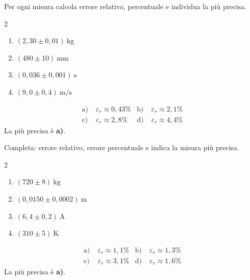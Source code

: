 \begin{question}[ID=4.4, subtitle={Errore relativo su massa, lunghezza, tempo, velocità}, tags={errori, misure}, difficulty=media]
Per ogni misura calcola errore relativo, percentuale e individua la più precisa.
\begin{center}\begin{minipage}{0.92\linewidth}
\begin{multicols}{2}
\begin{enumerate}[label=\alph*),leftmargin=1.8cm]
\item $(2{,}30 \pm 0{,}01)\ \text{kg}$
\item $(480 \pm 10)\ \text{mm}$
\item $(0{,}036 \pm 0{,}001)\ \text{s}$
\item $(9{,}0 \pm 0{,}4)\ \text{m/s}$
\end{enumerate}
\end{multicols}
\end{minipage}\end{center}
\begin{solution}
\begin{align*}
\text{a)}\; &\varepsilon_r \approx 0{,}43\% &
\text{b)}\; &\varepsilon_r \approx 2{,}1\% \\
\text{c)}\; &\varepsilon_r \approx 2{,}8\% &
\text{d)}\; &\varepsilon_r \approx 4{,}4\%
\end{align*}
La più precisa è \textbf{a)}.
\end{solution}
\end{question}

\begin{question}[ID=4.5, subtitle={Errore relativo su massa, distanza, corrente, temperatura}, tags={errori, misure}, difficulty=media]
Completa: errore relativo, errore percentuale e indica la misura più precisa.
\begin{center}\begin{minipage}{0.92\linewidth}
\begin{multicols}{2}
\begin{enumerate}[label=\alph*),leftmargin=1.8cm]
\item $(720 \pm 8)\ \text{kg}$
\item $(0{,}0150 \pm 0{,}0002)\ \text{m}$
\item $(6{,}4 \pm 0{,}2)\ \text{A}$
\item $(310 \pm 5)\ \text{K}$
\end{enumerate}
\end{multicols}
\end{minipage}\end{center}
\begin{solution}
\begin{align*}
\text{a)}\; &\varepsilon_r \approx 1{,}1\% &
\text{b)}\; &\varepsilon_r \approx 1{,}3\% \\
\text{c)}\; &\varepsilon_r \approx 3{,}1\% &
\text{d)}\; &\varepsilon_r \approx 1{,}6\%
\end{align*}
La più precisa è \textbf{a)}.
\end{solution}
\end{question}
